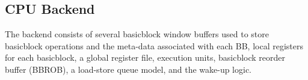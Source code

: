 \subsection{CPU Backend}
\label{sec:cpu_backend}

The backend consists of several basicblock window buffers used to store
basicblock operations and the meta-data associated with each BB, local registers
for each basicblock, a global register file, execution units, basicblock reorder
buffer (BBROB), a load-store queue model, and the wake-up logic.




